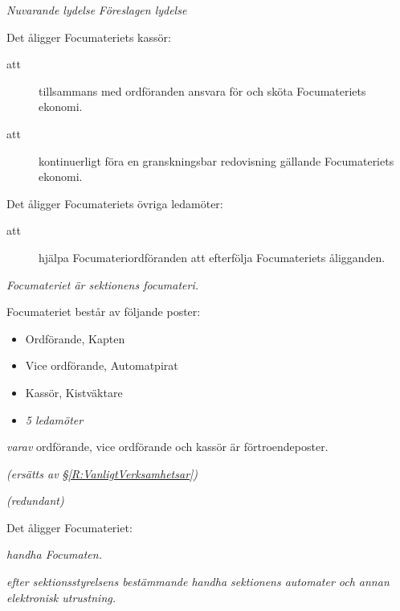 \documentclass{article}
\newenvironment{lydelse}
    {\begin{paracol}{2}%
        \emph{Nuvarande lydelse}%
        \switchcolumn%
        \emph{Föreslagen lydelse}%
    \end{paracol}%
    \begin{enumerate}[label=\thesubsection.\arabic*]%
    \begin{paracol}{2}%
    }{\end{paracol}\end{enumerate}}
\begin{document}
\begin{lydelse}
    \item Det åligger Focumateriets kassör:
	\begin{description}
		\item[att] tillsammans med ordföranden ansvara för och sköta Focumateriets ekonomi.
		\item[att] kontinuerligt föra en granskningsbar redovisning gällande Focumateriets ekonomi.
	\end{description}

    \item Det åligger Focumateriets övriga ledamöter:
	\begin{description}
		\item[att] hjälpa Focumateriordföranden att efterfölja Focumateriets åligganden.
	\end{description}
    
    \setcounter{section}{5}
    \setcounter{subsection}{7}
    
    \switchcolumn
    
    \item \emph{Focumateriet är sektionens focumateri.}

    \item Focumateriet består av följande poster:
    \begin{itemize}
        \item Ordförande, Kapten
    	\item Vice ordförande, Automatpirat
    	\item Kassör, Kistväktare
    	\item \emph{5 ledamöter}
    \end{itemize}
    \emph{varav} ordförande, vice ordförande och kassör är förtroendeposter.
    
    \item[] \emph{(ersätts av \S \ref{R:VanligtVerksamhetsar})}\vspace{1.2em}
    
    \item[] \emph{(redundant)}\vspace{6em}
    

    \item Det åligger Focumateriet:
    \begin{aligganden}
        \item \emph{handha Focumaten.}
        \item \emph{efter sektionsstyrelsens bestämmande handha sektionens automater och annan elektronisk utrustning.}
    \end{aligganden}
    

\end{lydelse}
\end{document}
